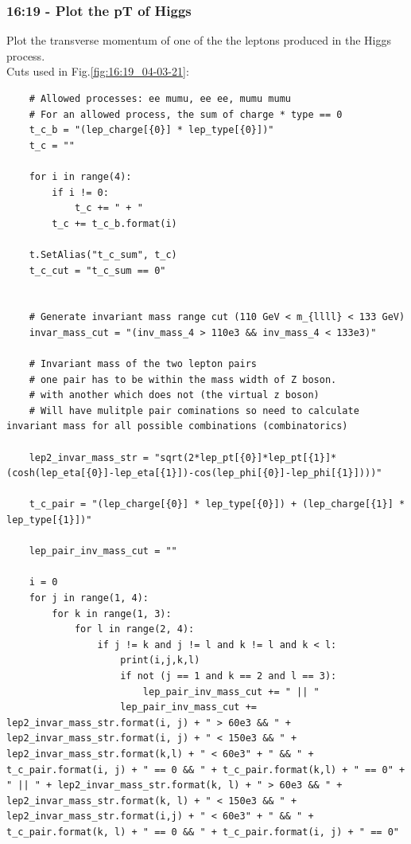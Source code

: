 \subsubsection*{16:19 - Plot the pT of Higgs}
Plot the transverse momentum of one of the the leptons produced in the Higgs process.
\\
Cuts used in Fig.\ref{fig:16:19_04-03-21}:
\begin{lstlisting}
    # Allowed processes: ee mumu, ee ee, mumu mumu
    # For an allowed process, the sum of charge * type == 0 
    t_c_b = "(lep_charge[{0}] * lep_type[{0}])"  
    t_c = ""
    
    for i in range(4):
        if i != 0:
            t_c += " + "
        t_c += t_c_b.format(i)

    t.SetAlias("t_c_sum", t_c)
    t_c_cut = "t_c_sum == 0"
    
    
    # Generate invariant mass range cut (110 GeV < m_{llll} < 133 GeV)
    invar_mass_cut = "(inv_mass_4 > 110e3 && inv_mass_4 < 133e3)"
    
    # Invariant mass of the two lepton pairs 
    # one pair has to be within the mass width of Z boson.
    # with another which does not (the virtual z boson)
    # Will have mulitple pair cominations so need to calculate invariant mass for all possible combinations (combinatorics)

    lep2_invar_mass_str = "sqrt(2*lep_pt[{0}]*lep_pt[{1}]*(cosh(lep_eta[{0}]-lep_eta[{1}])-cos(lep_phi[{0}]-lep_phi[{1}])))"

    t_c_pair = "(lep_charge[{0}] * lep_type[{0}]) + (lep_charge[{1}] * lep_type[{1}])"

    lep_pair_inv_mass_cut = ""

    i = 0
    for j in range(1, 4):
        for k in range(1, 3):
            for l in range(2, 4):
                if j != k and j != l and k != l and k < l:
                    print(i,j,k,l)
                    if not (j == 1 and k == 2 and l == 3):
                        lep_pair_inv_mass_cut += " || "
                    lep_pair_inv_mass_cut += lep2_invar_mass_str.format(i, j) + " > 60e3 && " + lep2_invar_mass_str.format(i, j) + " < 150e3 && " + lep2_invar_mass_str.format(k,l) + " < 60e3" + " && " + t_c_pair.format(i, j) + " == 0 && " + t_c_pair.format(k,l) + " == 0" + " || " + lep2_invar_mass_str.format(k, l) + " > 60e3 && " + lep2_invar_mass_str.format(k, l) + " < 150e3 && " + lep2_invar_mass_str.format(i,j) + " < 60e3" + " && " + t_c_pair.format(k, l) + " == 0 && " + t_c_pair.format(i, j) + " == 0"
    

\end{lstlisting}
